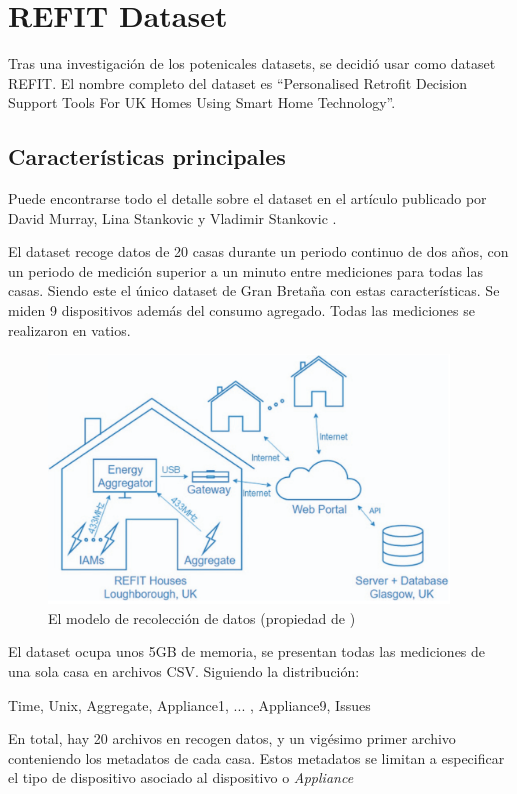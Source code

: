 \section{REFIT Dataset}
Tras una investigación de los potenicales datasets, se decidió usar como dataset REFIT. El nombre completo del dataset es \enquote{Personalised Retrofit Decision Support Tools For UK Homes Using Smart Home Technology}\autocite{REFIT}.
\subsection{Características principales}
Puede encontrarse todo el detalle sobre el dataset en el artículo publicado por David Murray, Lina Stankovic y Vladimir Stankovic \autocite{REFIT}.

El dataset recoge datos de 20 casas durante un periodo continuo de dos años, con un periodo de medición superior a un minuto entre mediciones para todas las casas. Siendo este el único dataset de Gran Bretaña con estas características.
Se miden 9 dispositivos además del consumo agregado. Todas las mediciones se realizaron en vatios. 

\begin{figure}[H]
    \centering
    \includegraphics[height=250px]{images/REFITmodeloDatos.png}
    \caption{El modelo de recolección de datos (propiedad de \autocite{REFIT})}
    \label{diagramaBBDD}
\end{figure}

El dataset ocupa unos 5GB de memoria, se presentan todas las mediciones de una sola casa en archivos CSV. Siguiendo la distribución:
\begin{center}
    Time, Unix, Aggregate, Appliance1, ... , Appliance9, Issues
\end{center}
En total, hay 20 archivos en recogen datos, y un vigésimo primer archivo conteniendo los metadatos de cada casa. Estos metadatos se limitan a especificar el tipo de dispositivo asociado al dispositivo o \textit{Appliance} 

